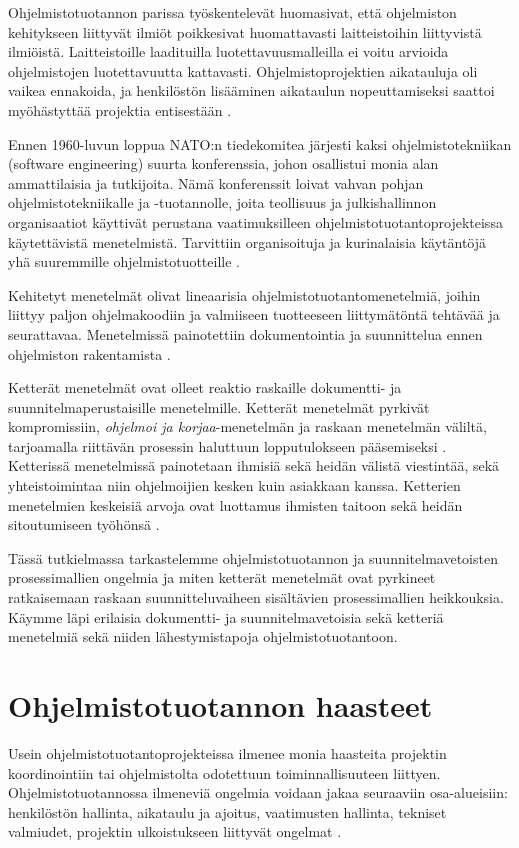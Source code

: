 \documentclass[finnish]{tktltiki2}
\theoremstyle{definition}
\theoremstyle{remark}
\begin{document}
Ohjelmistotuotannon parissa työskentelevät huomasivat, että ohjelmiston kehitykseen liittyvät ilmiöt poikkesivat huomattavasti laitteistoihin liittyvistä ilmiöistä. Laitteistoille laadituilla luotettavuusmalleilla ei voitu arvioida ohjelmistojen luotettavuutta kattavasti. Ohjelmistoprojektien aikatauluja oli vaikea ennakoida, ja henkilöstön lisääminen aikataulun nopeuttamiseksi saattoi myöhästyttää projektia entisestään \cite{BOE06}.

Ennen 1960-luvun loppua NATO:n tiedekomitea järjesti kaksi ohjelmistotekniikan (software engineering) suurta konferenssia, johon osallistui monia alan ammattilaisia ja tutkijoita. Nämä konferenssit loivat vahvan pohjan ohjelmistotekniikalle ja -tuotannolle, joita teollisuus ja julkishallinnon organisaatiot käyttivät perustana vaatimuksilleen ohjelmistotuotantoprojekteissa käytettävistä menetelmistä. Tarvit\-tiin organisoituja ja kurinalaisia käytäntöjä yhä suuremmille ohjelmistotuotteille \cite{BOE06}.

Kehitetyt menetelmät olivat lineaarisia ohjelmistotuotantomenetelmiä, joihin liittyy paljon ohjelmakoodiin ja valmiiseen tuotteeseen liittymätöntä tehtävää ja seurattavaa. Menetelmissä painotettiin dokumentointia ja suunnittelua ennen ohjelmiston rakentamista \cite{FOW01a}.

Ketterät menetelmät ovat olleet reaktio raskaille dokumentti- ja suunnitelmaperustaisille menetelmille. Ketterät menetelmät pyrkivät kompromissiin, \textit{ohjelmoi ja korjaa}-menetelmän ja raskaan menetelmän väliltä, tarjoamalla riittävän prosessin haluttuun lopputulokseen pääsemiseksi \cite{FOW01a}. Ketterissä menetelmissä painotetaan ihmisiä sekä heidän välistä viestintää, sekä yhteistoimintaa niin ohjelmoijien kesken kuin asiakkaan kanssa. Ketterien menetelmien keskeisiä arvoja ovat luottamus ihmisten taitoon sekä heidän sitoutumiseen työhönsä \cite{COH01}.

Tässä tutkielmassa tarkastelemme ohjelmistotuotannon ja suunnitelmavetoisten prosessimallien ongelmia ja miten ketterät menetelmät ovat pyrkineet ratkaisemaan raskaan suunnitteluvaiheen sisältävien prosessimallien heikkouksia. Käymme läpi erilaisia dokumentti- ja suunnitelmavetoisia sekä ketteriä menetelmiä sekä niiden lähestymistapoja ohjelmistotuotantoon.

\section{Ohjelmistotuotannon haasteet}

Usein ohjelmistotuotantoprojekteissa ilmenee monia haasteita projektin koordinointiin tai ohjelmistolta odotettuun toiminnallisuuteen liittyen. Ohjelmistotuotannossa ilmeneviä ongelmia voidaan jakaa seuraaviin osa-alueisiin: henkilöstön hallinta, aikataulu ja ajoitus, vaatimusten hallinta, tekniset valmiudet, projektin ulkoistukseen liittyvät ongelmat \cite{BOE88}.
\end{document}
